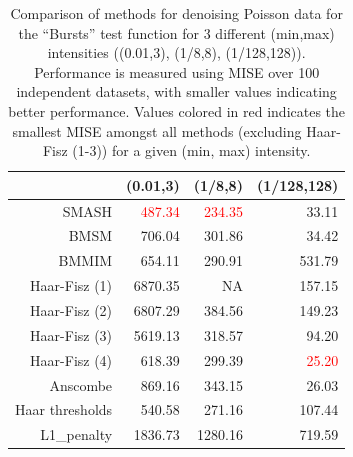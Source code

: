 \documentclass[12pt]{article}
\begin{document}
\begin{table}[ht]
\centering
\begin{tabular}{rrrr}
  \hline
 & (0.01,3) & (1/8,8) & (1/128,128) \\ 
  \hline
SMASH & \textcolor{red}{487.34} & \textcolor{red}{234.35} & 33.11 \\ 
  BMSM & 706.04 & 301.86 & 34.42 \\ 
  BMMIM & 654.11 & 290.91 & 531.79 \\ 
	Haar-Fisz (1) & 6870.35 & NA & 157.15 \\
	Haar-Fisz (2) & 6807.29 & 384.56 & 149.23 \\
	Haar-Fisz (3) & 5619.13 & 318.57 & 94.20 \\	
	Haar-Fisz (4) & 618.39 & 299.39 & \textcolor{red}{25.20} \\ 
  Anscombe & 869.16 & 343.15 & 26.03 \\ 
  Haar thresholds & 540.58 & 271.16 & 107.44 \\ 
  L1\_penalty & 1836.73 & 1280.16 & 719.59 \\ 
   \hline
\end{tabular}
\caption{Comparison of methods for denoising Poisson data for the ``Bursts'' test function for 3 different (min,max) intensities ((0.01,3), (1/8,8), (1/128,128)). Performance is measured using MISE over 100 independent datasets, with smaller values indicating better performance. Values colored in red indicates the smallest MISE amongst all methods (excluding Haar-Fisz (1-3)) for a given (min, max) intensity.} 
\label{table:pois_bur}
\end{table}
\end{document}
